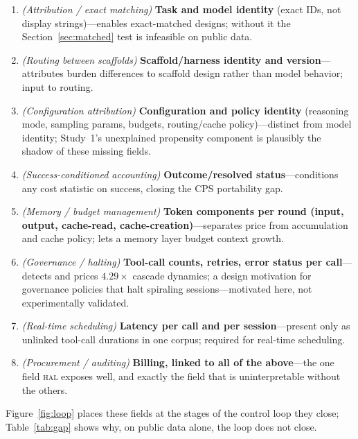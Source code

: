 \documentclass{article}
\newcommand{\hal}{\textsc{hal}}
\begin{document}
\begin{enumerate}[nosep,leftmargin=1.5em]
\item \emph{(Attribution / exact matching)} \textbf{Task and model identity} (exact IDs, not display strings)---enables exact-matched designs; without it the Section~\ref{sec:matched} test is infeasible on public data.
\item \emph{(Routing between scaffolds)} \textbf{Scaffold/harness identity and version}---attributes burden differences to scaffold design rather than model behavior; input to routing.
\item \emph{(Configuration attribution)} \textbf{Configuration and policy identity} (reasoning mode, sampling params, budgets, routing/cache policy)---distinct from model identity; Study~1's unexplained propensity component is plausibly the shadow of these missing fields.
\item \emph{(Success-conditioned accounting)} \textbf{Outcome/resolved status}---conditions any cost statistic on success, closing the CPS portability gap.
\item \emph{(Memory / budget management)} \textbf{Token components per round (input, output, cache-read, cache-creation)}---separates price from accumulation and cache policy; lets a memory layer budget context growth.
\item \emph{(Governance / halting)} \textbf{Tool-call counts, retries, error status per call}---detects and prices $4.29\times$ cascade dynamics; a design motivation for governance policies that halt spiraling sessions---motivated here, not experimentally validated.
\item \emph{(Real-time scheduling)} \textbf{Latency per call and per session}---present only as unlinked tool-call durations in one corpus; required for real-time scheduling.
\item \emph{(Procurement / auditing)} \textbf{Billing, linked to all of the above}---the one field \hal{} exposes well, and exactly the field that is uninterpretable without the others.
\end{enumerate}

\noindent Figure~\ref{fig:loop} places these fields at the stages of the control loop they close; Table~\ref{tab:gap} shows why, on public data alone, the loop does not close.
\end{document}
